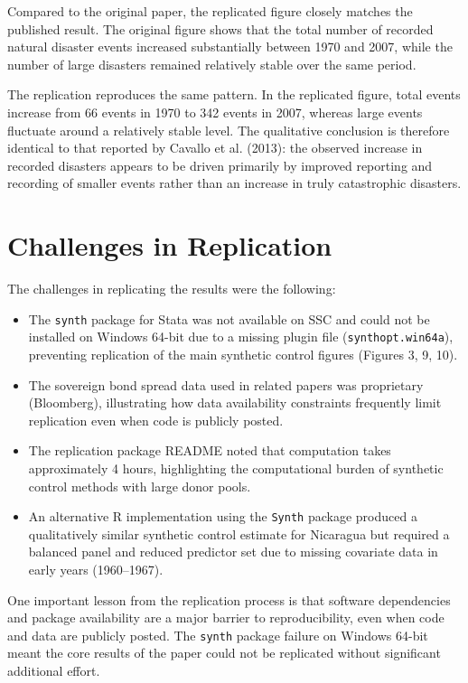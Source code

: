 \documentclass[12pt]{article}
\begin{document}
Compared to the original paper, the replicated figure closely matches the published result. The original figure shows that the total number of recorded natural disaster events increased substantially between 1970 and 2007, while the number of large disasters remained relatively stable over the same period.

The replication reproduces the same pattern. In the replicated figure, total events increase from 66 events in 1970 to 342 events in 2007, whereas large events fluctuate around a relatively stable level. The qualitative conclusion is therefore identical to that reported by Cavallo et al. (2013): the observed increase in recorded disasters appears to be driven primarily by improved reporting and recording of smaller events rather than an increase in truly catastrophic disasters.


\section{Challenges in Replication}

The challenges in replicating the results were the following:

\begin{itemize}
    \item The \texttt{synth} package for Stata was not available on SSC and could not be installed on Windows 64-bit due to a missing plugin file (\texttt{synthopt.win64a}), preventing replication of the main synthetic control figures (Figures 3, 9, 10).
    \item The sovereign bond spread data used in related papers was proprietary (Bloomberg), illustrating how data availability constraints frequently limit replication even when code is publicly posted.
    \item The replication package README noted that computation takes approximately 4 hours, highlighting the computational burden of synthetic control methods with large donor pools.
    \item An alternative R implementation using the \texttt{Synth} package produced a qualitatively similar synthetic control estimate for Nicaragua but required a balanced panel and reduced predictor set due to missing covariate data in early years (1960--1967).
\end{itemize}

One important lesson from the replication process is that software dependencies and package availability are a major barrier to reproducibility, even when code and data are publicly posted. The \texttt{synth} package failure on Windows 64-bit meant the core results of the paper could not be replicated without significant additional effort.
\end{document}
